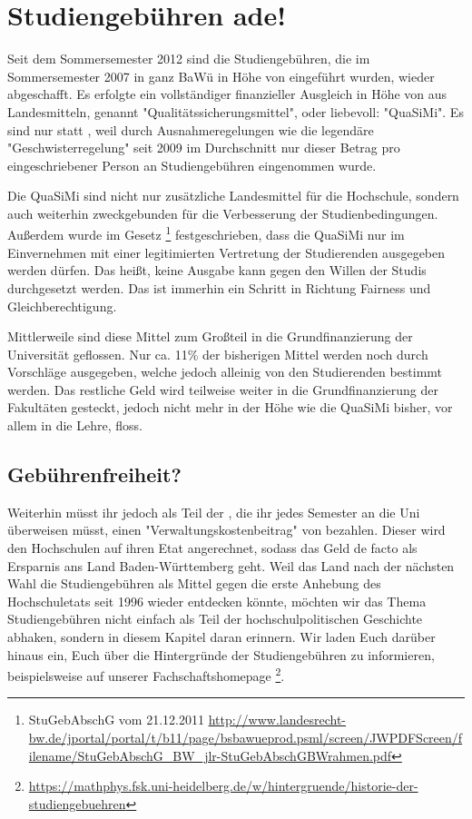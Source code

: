 %

\section{Studiengebühren ade!}
Seit dem Sommersemester 2012 sind die Studiengebühren, die im Sommersemester 2007 in ganz BaWü in Höhe von  eingeführt wurden, wieder abgeschafft. Es erfolgte ein vollständiger finanzieller Ausgleich in Höhe von  aus Landesmitteln, genannt "Qualitätssicherungsmittel", oder liebevoll: "QuaSiMi". Es sind nur  statt , weil durch Ausnahmeregelungen wie die legendäre "Geschwisterregelung" seit 2009 im Durchschnitt nur dieser Betrag pro eingeschriebener Person an Studiengebühren eingenommen wurde.

Die QuaSiMi sind nicht nur zusätzliche Landesmittel für die Hochschule, sondern auch weiterhin zweckgebunden für die Verbesserung der Studienbedingungen. Außerdem wurde im Gesetz \footnote{StuGebAbschG vom 21.12.2011 \url{http://www.landesrecht-bw.de/jportal/portal/t/b11/page/bsbawueprod.psml/screen/JWPDFScreen/filename/StuGebAbschG\_BW\_jlr-StuGebAbschGBWrahmen.pdf}} festgeschrieben, dass die QuaSiMi nur im Einvernehmen mit einer legitimierten Vertretung der Studierenden ausgegeben werden dürfen. Das heißt, keine Ausgabe kann gegen den Willen der Studis durchgesetzt werden. Das ist immerhin ein Schritt in Richtung Fairness und Gleichberechtigung.

Mittlerweile sind diese Mittel zum Großteil in die Grundfinanzierung der Universität geflossen. Nur ca. 11\% der bisherigen Mittel werden noch durch Vorschläge ausgegeben, welche jedoch alleinig von den Studierenden bestimmt werden. Das restliche Geld wird teilweise weiter in die Grundfinanzierung der Fakultäten gesteckt, jedoch nicht mehr in der Höhe wie die QuaSiMi bisher, vor allem in die Lehre, floss.

\subsection*{Gebührenfreiheit?}
Weiterhin müsst ihr jedoch als Teil der \EUR{\beitragssumme}, die ihr jedes Semester an die Uni überweisen müsst, einen "Verwaltungskostenbeitrag" von \EUR{\verwaltungsbetrag} bezahlen. Dieser wird den Hochschulen auf ihren Etat angerechnet, sodass das Geld de facto als Ersparnis ans Land Baden-Württemberg geht. Weil das Land nach der nächsten Wahl die Studiengebühren als Mittel gegen die erste Anhebung des Hochschuletats seit 1996 wieder entdecken könnte, möchten wir das Thema Studiengebühren nicht einfach als Teil der hochschulpolitischen Geschichte abhaken, sondern in diesem Kapitel daran erinnern. Wir laden Euch darüber hinaus ein, Euch über die Hintergründe der Studiengebühren zu informieren, beispielsweise auf unserer Fachschaftshomepage \footnote{\url{https://mathphys.fsk.uni-heidelberg.de/w/hintergruende/historie-der-studiengebuehren}}.

